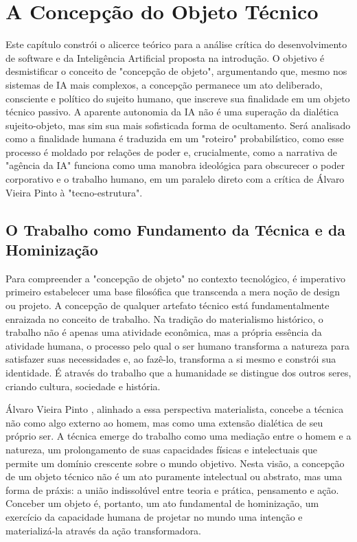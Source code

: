 \chapter{A Concepção do Objeto Técnico}\label{cap:concepcao_obj_tecnico}

Este capítulo constrói o alicerce teórico para a análise crítica do desenvolvimento de software e da Inteligência Artificial proposta na introdução. 
O objetivo é desmistificar 
o conceito de "concepção de objeto", argumentando que, mesmo nos sistemas de IA mais complexos, a concepção permanece um ato deliberado, consciente e político do sujeito humano, 
que inscreve sua finalidade em um objeto técnico passivo. 
A aparente autonomia da IA não é uma superação da dialética sujeito-objeto, mas sim sua mais sofisticada forma de 
ocultamento. 
Será analisado como a finalidade humana é traduzida em um "roteiro" probabilístico, como esse processo é moldado por relações de poder e, crucialmente, como a 
narrativa de "agência da IA" funciona como uma manobra ideológica para obscurecer o poder corporativo e o trabalho humano, em um paralelo direto com a crítica de Álvaro Vieira 
Pinto à "tecno-estrutura". 

\section{O Trabalho como Fundamento da Técnica e da Hominização}\label{sec:trabalho_como_fundamento}

Para compreender a "concepção de objeto" no contexto tecnológico, é imperativo primeiro estabelecer uma base filosófica que transcenda a mera noção de design ou projeto. 
A concepção de qualquer artefato técnico está fundamentalmente enraizada no conceito de trabalho. 
Na tradição do materialismo histórico, o trabalho não é apenas uma atividade 
econômica, mas a própria essência da atividade humana, o processo pelo qual o ser humano transforma a natureza para satisfazer suas necessidades e, ao fazê-lo, transforma a si 
mesmo e constrói sua identidade. 
É através do trabalho que a humanidade se distingue dos outros seres, criando cultura, sociedade e história. 

Álvaro Vieira Pinto \cite{VieiraPinto2005}, alinhado a essa perspectiva materialista, concebe a técnica não como algo externo ao homem, mas como uma extensão dialética de seu próprio ser. 
A técnica 
emerge do trabalho como uma mediação entre o homem e a natureza, um prolongamento de suas capacidades físicas e intelectuais que permite um domínio crescente sobre o mundo 
objetivo. 
Nesta visão, a concepção de um objeto técnico não é um ato puramente intelectual ou abstrato, mas uma forma de práxis: a união indissolúvel entre teoria e prática, 
pensamento e ação. 
Conceber um objeto é, portanto, um ato fundamental de hominização, um exercício da capacidade humana de projetar no mundo uma intenção e materializá-la 
através da ação transformadora. 


